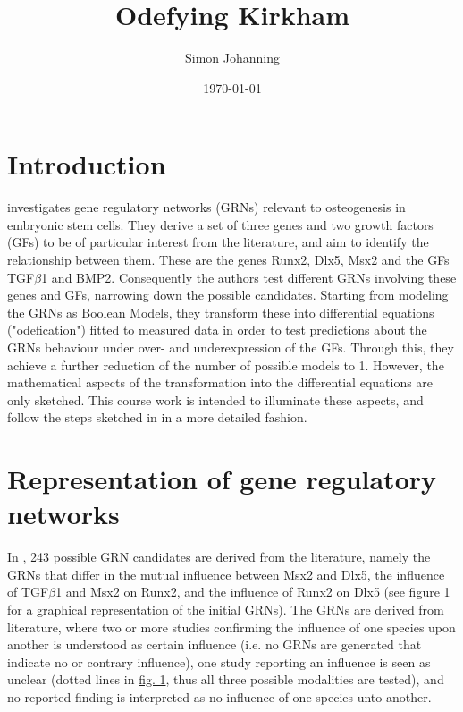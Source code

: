 \documentclass[11pt]{article}
\begin{document}
\title{Odefying Kirkham}
\author{Simon Johanning}
\date{\today}
\maketitle

\tableofcontents

\section{Introduction} \label{sec:Intro}
\cite{Kirkham} investigates gene regulatory networks (GRNs) relevant to
osteogenesis in embryonic stem cells. They derive a set of three genes and
two growth factors (GFs) to be of particular interest from the literature, and
aim to identify the relationship between them. These are the genes Runx2,
Dlx5, Msx2 and the GFs TGF$\beta$1 and BMP2.
Consequently the authors test different GRNs involving these genes and
GFs, narrowing down the possible candidates. Starting from modeling the
GRNs as Boolean Models, they transform these into differential equations
("odefication") fitted to measured data in order to test predictions about the
GRNs behaviour under over- and underexpression of the GFs. Through this,
they achieve a further reduction of the number of possible models to 1.
However, the mathematical aspects of the transformation into the differential equations are only sketched. This course work is intended to illuminate these aspects, and follow the steps sketched in \cite{Kirkham} in a more detailed fashion.

\section{Representation of gene regulatory networks}
In \cite{Kirkham}, 243 possible GRN candidates are derived from the literature, namely the GRNs that differ in the mutual influence between Msx2 and Dlx5, the influence of TGF$\beta$1 and Msx2 on Runx2, and the influence of Runx2 on Dlx5
(see \hyperref[regulatory_network]{figure 1} for a graphical representation of the initial GRNs).
The GRNs are derived from literature, where two or more studies confirming the influence of one species upon another is understood as certain influence (i.e. no GRNs are generated that indicate no or contrary influence), one study reporting an influence is seen as unclear (dotted lines in \hyperref[regulatory_network]{fig. 1}, thus all three possible modalities are tested), and no reported finding is interpreted as no influence of one species unto another.
\end{document}
